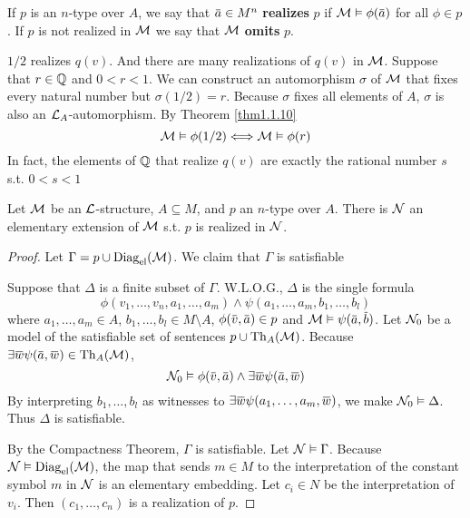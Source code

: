 \documentclass[11pt]{article}
\begin{document}
\begin{definition}[]
If \(p\) is an \(n\)-type over \(A\), we say that \(\bara\in M^n\) \textbf{realizes} \(p\) if \(\calm\vDash\phi(\bara)\)
for all \(\phi\in p\). If \(p\) is not realized in \(\mathcal{M}\) we say that \(\mathcal{M}\) \textbf{omits} \(p\).
\end{definition}

\(1/2\) realizes \(q(v)\). And there are many realizations of \(q(v)\) in \(\mathcal{M}\). Suppose
that \(r\in\mathbb{Q}\) and \(0<r<1\). We can construct an automorphism \(\sigma\) of \(\mathcal{M}\) that fixes every natural
number but \(\sigma(1/2)=r\). Because \(\sigma\) fixes all elements of \(A\), \(\sigma\) is also
an \(\mathcal{L}_A\)-automorphism. By Theorem \ref{thm1.1.10}
\begin{equation*}
\mathcal{M}\vDash\phi(1/2)\Longleftrightarrow\mathcal{M}\vDash\phi(r)
\end{equation*}
In fact, the elements of \(\mathbb{Q}\) that realize \(q(v)\) are exactly the rational number \(s\) s.t. \(0<s<1\)

\begin{proposition}[]
\label{prop4.1.3}
Let \(\mathcal{M}\) be an \(\mathcal{L}\)-structure, \(A\subseteq M\), and \(p\) an \(n\)-type over \(A\). There is \(\mathcal{N}\) an
elementary extension of \(\mathcal{M}\) s.t. \(p\) is realized in \(\mathcal{N}\).
\end{proposition}

\begin{proof}
Let \(\Gamma=p\cup\operatorname{Diag}_{\operatorname{el}}(\mathcal{M})\). We claim that \(\Gamma\) is satisfiable

Suppose that \(\Delta\) is a finite subset of \(\Gamma\). W.L.O.G., \(\Delta\) is the single formula
\begin{equation*}
\phi(v_1,\dots,v_n,a_1,\dots,a_m)\wedge\psi(a_1,\dots,a_m,b_1,\dots,b_l)
\end{equation*}
where \(a_1,\dots,a_m\in A\), \(b_1,\dots,b_l\in M\setminus A\), \(\phi(\barv,\bara)\in p\) and \(\calm\vDash\psi(\bara,\barb)\).
Let \(\mathcal{N}_0\) be a model of the satisfiable set of sentences \(p\cup\operatorname{Th}_A(\mathcal{M})\).
Because \(\exists\barw\psi(\bara,\barw)\in\Th_A(\calm)\),
\begin{equation*}
\caln_0\vDash\phi(\barv,\bara)\wedge\exists\barw\psi(\bara,\barw)
\end{equation*}
By interpreting \(b_1,\dots,b_l\) as witnesses to \(\exists\barw\psi(a_1,\dots,a_m,\barw)\), we make \(\mathcal{N}_0\vDash\Delta\).
Thus \(\Delta\) is satisfiable.

By the Compactness Theorem, \(\Gamma\) is satisfiable. Let \(\mathcal{N}\vDash\Gamma\). Because \(\mathcal{N}\vDash\operatorname{Diag}_{\operatorname{el}}(\mathcal{M})\), the map
that sends \(m\in M\) to the interpretation of the constant symbol \(m\) in \(\mathcal{N}\) is an elementary
embedding. Let \(c_i\in N\) be the interpretation of \(v_i\). Then \((c_1,\dots,c_n)\) is a realization
of \(p\).
\end{proof}
\end{document}
